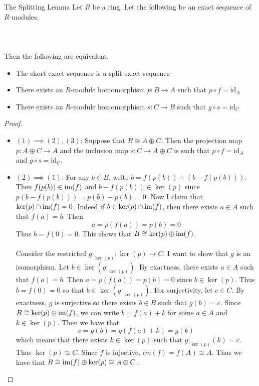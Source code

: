 \documentclass[a4paper]{article}
\begin{document}
\begin{prp}{The Splitting Lemma}{} Let $R$ be a ring. Let the following be an exact sequence of $R$-modules. \\~\\
\\~\\
Then the following are equivalent. 
\begin{itemize}
\item The short exact sequence is a split exact sequence
\item There exists an $R$-module homomorphism $p:B\to A$ such that $p\circ f=\text{id}_A$
\item There exists an $R$-module homomorphism $s:C\to B$ such that $g\circ s=\text{id}_C$
\end{itemize} 
\begin{proof}~\\
\begin{itemize}
\item $(1)\implies(2),(3)$: Suppose that $B\cong A\oplus C$. Then the projection map $p:A\oplus C\to A$ and the inclusion map $s:C\to A\oplus C$ is such that $p\circ f=\text{id}_A$ and $g\circ s=\text{id}_C$. 

\item $(2)\implies(1)$: For any $b\in B$, write $b=f(p(b))+(b-f(p(b)))$. Then $f(p(b))\in\operatorname{im}(f)$ and $b-f(p(b))\in\ker(p)$ since $p(b-f(p(b)))=p(b)-p(b)=0$. Now I claim that $\ker(p)\cap\operatorname{im}(f)=0$. Indeed if $b\in\ker(p)\cap\operatorname{im}(f)$, then there exists $a\in A$ such that $f(a)=b$. Then $$a=p(f(a))=p(b)=0$$ Thus $b=f(0)=0$. This shows that $B\cong\ker(p)\oplus\operatorname{im}(f)$. \\~\\

Consider the restricted $g|_{\ker(p)}:\ker(p)\to C$. I want to show that $g$ is an isomorphism. Let $b\in\ker\left(g|_{\ker(p)}\right)$. By exactness, there exists $a\in A$ such that $f(a)=b$. Then $a=p(f(a))=p(b)=0$ since $b\in\ker(p)$. Thus $b=f(0)=0$ so that $b\in\ker\left(g|_{\ker(p)}\right)$. For surjectivity, let $c\in C$. By exactness, $g$ is surjective so there exists $b\in B$ such that $g(b)=c$. Since $B\cong\ker(p)\oplus\operatorname{im}(f)$, we can write $b=f(a)+k$ for some $a\in A$ and $k\in\ker(p)$. Then we have that $$c=g(b)=g(f(a)+k)=g(k)$$ which means that there exists $k\in\ker(p)$ such that $g|_{\ker(p)}(k)=c$. Thus $\ker(p)\cong C$. Since $f$ is injective, $im(f)=f(A)\cong A$. Thus we have that $B\cong\operatorname{im}(f)\oplus\ker(p)\cong A\oplus C$. 


\end{itemize}
\end{proof}
\end{prp}
\end{document}
